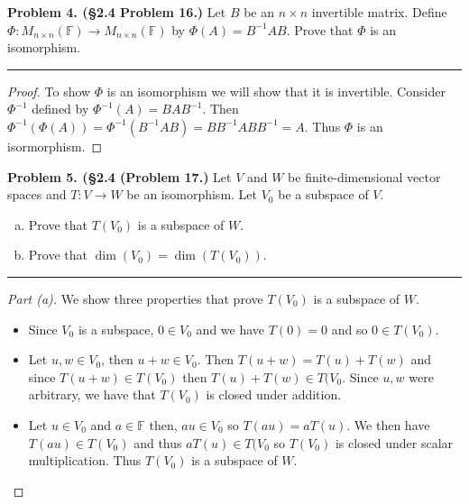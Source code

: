\documentclass[leqno]{article}
\theoremstyle{nonumberplain}
\newtheorem{proof}{Proof}
\begin{document}
\pagebreak





\noindent\textbf{Problem 4. (\S 2.4 Problem 16.)}  Let $B$ be an $n\times n$ invertible matrix. Define $\Phi \colon M_{n\times n}(\mathbb{F})\to M_{n\times n}(\mathbb{F})$ by $\Phi(A)=B^{-1}AB$. Prove that $\Phi$ is an isomorphism.

\noindent\rule[0.5ex]{\linewidth}{1pt}

\begin{proof}
To show $\Phi$ is an isomorphism we will show that it is invertible.  Consider $\Phi^{-1}$ defined by $\Phi^{-1}(A)=BAB^{-1}$.  Then $\Phi^{-1}(\Phi(A))=\Phi^{-1}(B^{-1}AB)=BB^{-1}ABB^{-1}=A$.  Thus $\Phi$ is an isormorphism.
\end{proof}

\pagebreak




\noindent\textbf{Problem 5. (\S 2.4 (Problem 17.)} Let $V$ and $W$ be finite-dimensional vector spaces and $T\colon V\to W$ be an isomorphism. Let $V_0$ be a subspace of $V$.
\begin{enumerate}[(a)]
\item Prove that $T(V_0)$ is a subspace of $W$.
\item Prove that $\dim(V_0)=\dim(T(V_0)).$
\end{enumerate}

\noindent\rule[0.5ex]{\linewidth}{1pt}

\begin{proof}[Part (a)] We show three properties that prove $T(V_0)$ is a subspace of $W$.
\begin{itemize}
\item Since $V_0$ is a subspace, $0\in V_0$ and we have $T(0)=0$ and so $0\in T(V_0)$.
\item Let $u,w \in V_0$, then $u+w\in V_0$. Then $T(u+w)=T(u)+T(w)$ and since $T(u+w)\in T(V_0)$ then $T(u)+T(w)\in T(V_0$. Since $u,w$ were arbitrary, we have that $T(V_0)$ is closed under addition.
\item Let $u\in V_0$ and $a\in \mathbb{F}$ then, $au\in V_0$ so $T(au)=aT(u)$. We then have $T(au)\in T(V_0)$ and thus $aT(u)\in T(V_0$ so $T(V_0)$ is closed under scalar multiplication.
Thus $T(V_0)$ is a subspace of $W$.
\end{itemize}
\end{proof}
\end{document}
